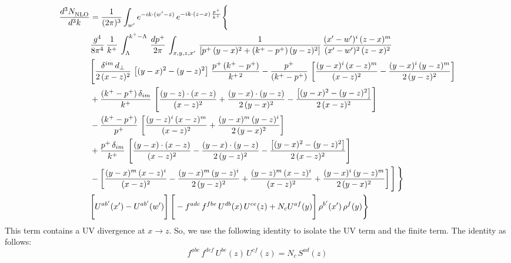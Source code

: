\documentclass[9pt]{article}
\numberwithin{equation}{section}
\begin{document}
\begin{align}
    \frac{d^{3}N_{\rm NLO}^{\rm}}{d^{3}k}  & =  \frac{1}{(2\pi)^{3}}  \int_{ w^\prime} e^{-ik\cdot(w'-z)}\,e^{-ik\cdot (z-x)\,\frac{p^{+}}{k^{+}}} \Bigg\{\notag \\ & \frac{g^{4}}{8\pi^{4}}\,\frac{1}{k^{+}}\,\int_{\Lambda}^{k^{+}-\Lambda}\, \frac{dp^{+}}{2\pi} \, \int_{x,y,z,x'}\,\frac{1}{\left[p^{+}\,(y-x)^{2}+(k^{+}-p^{+})\,(y-z)^{2}\right]}\, \frac{(x'-w')^{i}\,(z-x)^{m}}{(x'-w')^{2}\,(z-x)^{2}} \notag \\ & \Bigg[\frac{\delta^{im}\,d_{\perp}}{2\,(x-z)^{2}}\,\left[(y-x)^{2}-(y-z)^{2}\right]\,\frac{p^{+}\,(k^{+}-p^{+})}{k^{+\,2}}-\frac{p^{+}}{(k^{+}-p^{+})}\,\left[\frac{(y-x)^{i}\,(x-z)^{m}}{(x-z)^{2}}-\frac{(y-x)^{i}\,(y-z)^{m}}{2\,(y-z)^{2}}\right]\notag \\ & +\frac{(k^{+}-p^{+})\,\delta_{im}}{k^{+}}\,\left[\frac{(y-z)\cdot (x-z)}{(x-z)^{2}}+\frac{(y-x)\cdot (y-z)}{2\,(y-x)^{2}}-\frac{\left[(y-x)^{2}-(y-z)^{2}\right]}{2\,(x-z)^{2}}\right]\notag \\ & -\frac{(k^{+}-p^{+})}{p^{+}}\,\left[\frac{(y-z)^{i}\,(x-z)^{m}}{(x-z)^{2}}+\frac{(y-x)^{m}\,(y-z)^{i}}{2\,(y-x)^{2}}\right]\notag \\ & +\frac{p^{+}\,\delta_{im}}{k^{+}}\,\left[\frac{(y-x)\cdot (x-z)}{(x-z)^{2}}-\frac{(y-x)\cdot (y-z)}{2\,(y-z)^{2}}-\frac{\left[(y-x)^{2}-(y-z)^{2}\right]}{2\,(x-z)^{2}}\right]\notag \\ &-\left[\frac{(y-x)^{m}\,(x-z)^{i}}{(x-z)^{2}}-\frac{(y-x)^{m}\,(y-z)^{i}}{2\,(y-z)^{2}}+\frac{(y-z)^{m}\,(x-z)^{i}}{(x-z)^{2}}+\frac{(y-x)^{i}\,(y-z)^{m}}{2\,(y-x)^{2}}\right]\Bigg]\,\Bigg\} \notag \\ & \Bigg[U^{ab'}(x')-U^{ab'}(w')\Bigg]\,\Bigg[-f^{adc}\,f^{fbe}\,U^{db}(x)\,U^{ce}(z)+N_{c}U^{af}(y)\Bigg]\,\rho^{b'}(x')\,\rho^{f}(y)\Bigg\}
\end{align}
This term contains a UV divergence at $x\rightarrow z$.  So, we use the following identity to isolate the UV term and the finite term. The identity as follows:
$$f^{abc}\,f^{def}\,U^{be}(z)\,U^{cf}(z) = N_{c}\,S^{ad}(z)$$
\end{document}
